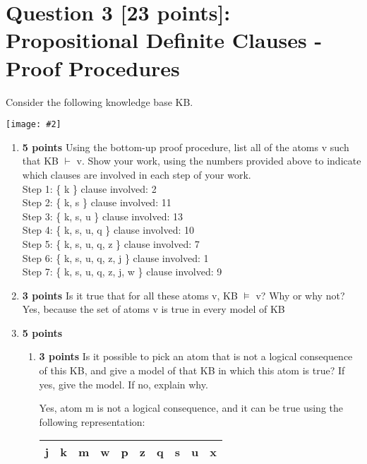 \documentclass{article}
\def\ans#1{{\color{ans}#1}}
\newcommand{\centerfig}[2]{\begin{center}\texttt{[image: \#2]}\end{center}}
\begin{document}
\section{Question 3 [23 points]: Propositional Definite Clauses - Proof Procedures}
Consider the following knowledge base KB.
\centerfig{0.2}{../figs/fig2}
\begin{enumerate}[label=(\alph*)]
    \item \textbf{5 points} Using the bottom-up proof procedure, list all of the atoms v such that KB $\vdash$ v. Show your work, using the numbers provided above to indicate which clauses are involved in each step of your work.\\
        \ans{
            Step 1:  \{ k \}  clause involved: 2 \\
            Step 2:  \{ k, s \}  clause involved: 11 \\
            Step 3:  \{ k, s, u \}  clause involved: 13 \\
            Step 4:  \{ k, s, u, q \}  clause involved: 10 \\
            Step 5:  \{ k, s, u, q, z \}  clause involved: 7 \\
            Step 6:  \{ k, s, u, q, z, j \}  clause involved: 1 \\
            Step 7:  \{ k, s, u, q, z, j, w \}  clause involved: 9 
        }
    \item \textbf{3 points} Is it true that for all these atoms v, KB $\vDash$ v? Why or why not?\\
        \ans{
          Yes, because the set of atoms v is true in every model of KB
        }
    \item \textbf{5 points}\\
    \begin{enumerate}[label=\roman*.]
        \item \textbf{3 points} Is it possible to pick an atom that is not a logical consequence of this KB, and give a model of that KB in which this atom is true? If yes, give the model. If no, explain why.\\
        \ans{
            Yes, atom m is not a logical consequence, and it can be true using the following representation:
            \scriptsize
            \setlength{\tabcolsep}{10pt}
            \begin{center}
            \begin{tabular}{SSSSSSSSSS} \toprule
                {j} & {k} & {m} & {w} & {p} & {z} & {q} & {s} & {u} & {x} \\ \midrule

\end{tabular}
\end{center}}
\end{enumerate}
\end{enumerate}
\end{document}
